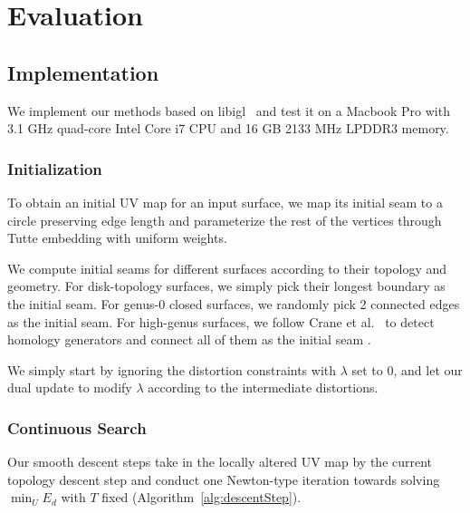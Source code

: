 
\section{Evaluation}
\label{sec:results}

\subsection{Implementation}
\label{sec:imp}

We implement our methods based on libigl\ \cite{libigl} and test it on a Macbook Pro with 3.1 GHz quad-core Intel Core i7 CPU and 16 GB 2133 MHz LPDDR3 memory.

\subsubsection{Initialization}
To obtain an initial UV map for an input surface, we map its initial seam to a circle preserving edge length and parameterize the rest of the vertices through Tutte embedding with uniform weights.

We compute initial seams for different surfaces according to their topology and geometry. For disk-topology surfaces, we simply pick their longest boundary as the initial seam. For genus-0 closed surfaces, we randomly pick 2 connected edges as the initial seam.  For high-genus surfaces, we follow Crane et al.~ to detect homology generators and connect all of them as the initial seam \minchen{[TODO]}.

We simply start by ignoring the distortion constraints with $\lambda$ set to $0$, and let our dual update to modify $\lambda$ according to the intermediate distortions.

\subsubsection{Continuous Search}
\label{sec:descentStep}

Our smooth descent steps take in the locally altered UV map by the current topology descent step and conduct one Newton-type iteration towards solving $\min_U E_d$ with $T$ fixed (Algorithm~\ref{alg:descentStep}).

